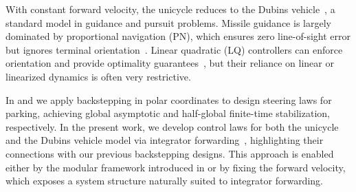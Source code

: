 \documentclass[letterpaper, 10 pt, conference]{ieeeconf}  %
\begin{document}
With constant forward velocity, the unicycle reduces to the Dubins vehicle~\cite{dubins1957curves}, a standard model in guidance and pursuit problems.  
Missile guidance is largely dominated by proportional navigation (PN), which ensures zero line-of-sight error but ignores terminal orientation~\cite{zarchan2012tactical,siouris2004missile}. Linear quadratic (LQ) controllers can enforce orientation and provide optimality guarantees~\cite{palumbo2010modern,ryoo2005optimal,ryoo2006time,shaferman2008linear}, but their reliance on linear or linearized dynamics is often very restrictive.

In \cite{todorovski2025_CLF} and \cite{Krstic2025_Dubins} we apply backstepping in polar coordinates to design steering laws for parking, achieving global asymptotic and half-global finite-time stabilization, respectively. In the present work, we develop control laws for both the unicycle and the Dubins vehicle model via integrator forwarding~\cite{mazenc1996adding, sepulchre1997forwarding, krstic2004feedback}, highlighting their connections with our previous backstepping designs. This approach is enabled either by the modular framework introduced in \cite{todorovski2025_CLF} or by fixing the forward velocity, which exposes a system structure naturally suited to integrator forwarding.  
\end{document}
